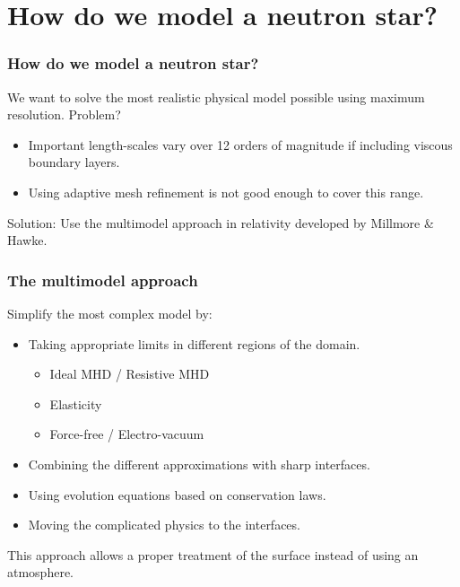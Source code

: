 \documentclass{beamer}
\begin{document}


\section{How do we model a neutron star?}
\begin{frame}
\frametitle{How do we model a neutron star?}
We want to solve the most realistic physical model possible using maximum resolution. Problem?
\begin{itemize}
\item{Important length-scales vary over 12 orders of magnitude if including viscous boundary layers.}
\item{Using adaptive mesh refinement is not good enough to cover this range.}
\end{itemize}
Solution: Use the multimodel approach in relativity developed by Millmore \& Hawke.
\end{frame}

\begin{frame}
\frametitle{The multimodel approach}
Simplify the most complex model by:
\begin{itemize}
\item{Taking appropriate limits in different regions of the domain.}
\begin{itemize}
\item{Ideal MHD / Resistive MHD}
\item{Elasticity}
\item{Force-free / Electro-vacuum}
\end{itemize}
\item{Combining the different approximations with sharp interfaces.}
\item{Using evolution equations based on conservation laws.}
\item{Moving the complicated physics to the interfaces.}
\end{itemize}
This approach allows a proper treatment of the surface instead of using an atmosphere.
\end{frame}
\end{document}
